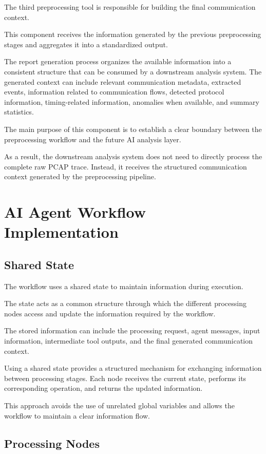 The third preprocessing tool is responsible for building the final communication context.

This component receives the information generated by the previous preprocessing stages and aggregates it into a standardized output.

The report generation process organizes the available information into a consistent structure that can be consumed by a downstream analysis system. The generated context can include relevant communication metadata, extracted events, information related to communication flows, detected protocol information, timing-related information, anomalies when available, and summary statistics.

The main purpose of this component is to establish a clear boundary between the preprocessing workflow and the future AI analysis layer.

As a result, the downstream analysis system does not need to directly process the complete raw PCAP trace. Instead, it receives the structured communication context generated by the preprocessing pipeline.

\section{AI Agent Workflow Implementation}

\subsection{Shared State}

The workflow uses a shared state to maintain information during execution.

The state acts as a common structure through which the different processing nodes access and update the information required by the workflow.

The stored information can include the processing request, agent messages, input information, intermediate tool outputs, and the final generated communication context.

Using a shared state provides a structured mechanism for exchanging information between processing stages. Each node receives the current state, performs its corresponding operation, and returns the updated information.

This approach avoids the use of unrelated global variables and allows the workflow to maintain a clear information flow.

\subsection{Processing Nodes}

